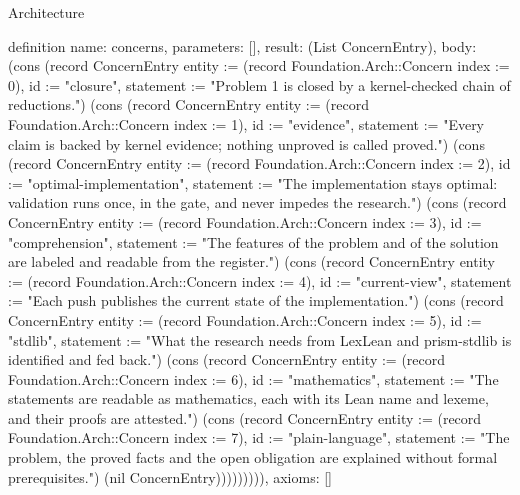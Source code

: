 \begin{lexlean}{Architecture}
\begin{semanticmodule}
definition{
  name: concerns,
  parameters: [],
  result: (List ConcernEntry),
  body: (cons (record ConcernEntry {entity := (record Foundation.Arch::Concern {index := 0}), id := "closure", statement := "Problem 1 is closed by a kernel-checked chain of reductions."}) (cons (record ConcernEntry {entity := (record Foundation.Arch::Concern {index := 1}), id := "evidence", statement := "Every claim is backed by kernel evidence; nothing unproved is called proved."}) (cons (record ConcernEntry {entity := (record Foundation.Arch::Concern {index := 2}), id := "optimal-implementation", statement := "The implementation stays optimal: validation runs once, in the gate, and never impedes the research."}) (cons (record ConcernEntry {entity := (record Foundation.Arch::Concern {index := 3}), id := "comprehension", statement := "The features of the problem and of the solution are labeled and readable from the register."}) (cons (record ConcernEntry {entity := (record Foundation.Arch::Concern {index := 4}), id := "current-view", statement := "Each push publishes the current state of the implementation."}) (cons (record ConcernEntry {entity := (record Foundation.Arch::Concern {index := 5}), id := "stdlib", statement := "What the research needs from LexLean and prism-stdlib is identified and fed back."}) (cons (record ConcernEntry {entity := (record Foundation.Arch::Concern {index := 6}), id := "mathematics", statement := "The statements are readable as mathematics, each with its Lean name and lexeme, and their proofs are attested."}) (cons (record ConcernEntry {entity := (record Foundation.Arch::Concern {index := 7}), id := "plain-language", statement := "The problem, the proved facts and the open obligation are explained without formal prerequisites."}) (nil ConcernEntry))))))))),
  axioms: []
}


\end{semanticmodule}
\end{lexlean}
